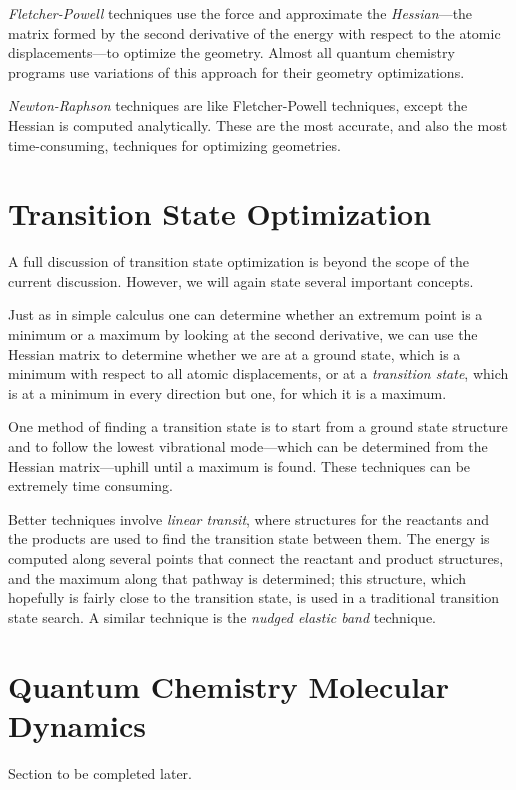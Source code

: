 \emph{Fletcher-Powell} techniques use the force and approximate the
\emph{Hessian}---the matrix formed by the second derivative of the
energy with respect to the atomic displacements---to optimize the
geometry. Almost all quantum chemistry programs use variations of this
approach for their geometry optimizations.

\emph{Newton-Raphson} techniques are like Fletcher-Powell techniques,
except the Hessian is computed analytically. These are the most
accurate, and also the most time-consuming, techniques for optimizing
geometries. 

\section{Transition State Optimization}
A full discussion of transition state optimization is beyond the scope
of the current discussion. However, we will again state several
important concepts.

Just as in simple calculus one can determine whether an extremum point
is a minimum or a maximum by looking at the second derivative, we can
use the Hessian matrix to determine whether we are at a ground state,
which is a minimum with respect to all atomic displacements, or at a
\emph{transition state}, which is at a minimum in every direction but
one, for which it is a maximum.

One method of finding a transition state is to start from a ground
state structure and to follow the lowest vibrational mode---which can
be determined from the Hessian matrix---uphill until a maximum is
found. These techniques can be extremely time consuming.

Better techniques involve \emph{linear transit}, where structures for
the reactants and the products are used to find the transition state
between them. The energy is computed along several points that connect
the reactant and product structures, and the maximum along that
pathway is determined; this structure, which hopefully is fairly close
to the transition state, is used in a traditional transition state
search. A similar technique is the \emph{nudged elastic band}
technique.

\section{Quantum Chemistry Molecular Dynamics}
Section to be completed later.
